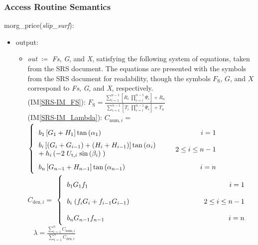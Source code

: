 \documentclass[12pt, titlepage]{article}
\newcommand{\iref}[1]{IM\ref{#1}}
\begin{document}
\subsubsection{Access Routine Semantics}
morg\_price(\textit{slip\_surf}):
\begin{itemize}
	\item output:
	\begin{itemize}
		\item[] \textit{out} $\coloneqq$ \textit{Fs}, \textit{G}, and 
		\textit{X}, satisfying the following system of 
		equations, taken from the SRS document. The equations are presented 
		with the symbols from the SRS document for readability, though the 
		symbols $F_\text{S}$, $G$, and $X$ correspond to \textit{Fs}, 
		\textit{G}, and \textit{X}, respectively.\\
		
		(\iref{SRS-IM_FS}): \( {F_\text{S}}= 
		\frac{\displaystyle\sum_{i=1}^{n-1} \left[ 
		{R_{i}}
			\;{\displaystyle\prod_{c=i}^{n-1} \Psi_{c}
			}\right] + {R_{n}} }{\displaystyle\sum_{i=1}^{n-1} \left[ {T_{i}}
			\;{\displaystyle\prod_{c=i}^{n-1} \Psi_{c}
			}\right] + {T_{n}} } \)\\
		
		(\iref{SRS-IM_Lambda}): \( {C_{\text{num},i}}= \) 
		\(  \left\{
		\renewcommand{\arraystretch}{2}
		\begin{tabular}{ p{6.5cm} r} 
		$ {{b}_{\text{1}}}\left[{{G}_{\text{1}} + {H}_{\text{1}}}
		\right]{\tan\left(\alpha_{\text{1}}\right) } $ &  $
		i={\text{1}} $ \\
		\noindent\parbox[c]{\hsize} {$ {{b}_{i}} \left[
			\left({{G}_{i} + {G}_{i-1}}\right) +
			\left({{H}_{i} + {H}_{i-1}}\right)
			\right]{\tan\left(\alpha_{i}\right)} \\ +
			{{h}_{i}}\left( 
			-{2}\;{U_{\text{t},i}}\;{\sin\left(\beta_{i}\right)}
			\;\right) $}
		&  $ 2\leq i \leq{n-1} $ \\ $
		{{b}_{n}}\left[{{G}_{n-1} +
			{H}_{n-1}}\right]{\tan\left(\alpha_{n-1}\right)
		} $ &  $ i=n $ \\
		\end{tabular} 
		\renewcommand{\arraystretch}{1}
		\right. \)
		~\newline~\newline
		\( {C_{\text{den},i}}= \)
		\(  \left\{
		\renewcommand{\arraystretch}{2}
		\begin{tabular}{ p{6.5cm} r} 
		$ {{b}_{\text{1}}}{{G}_{\text{1}}}{f_{\text{1}}} $ &  $
		i=\text{1} $ \\ $ {{b}_{i}}\;{\left({
				{f_{i}}{{G}_{i}} +
				{f_{i-1}}{{G}_{i-1}} }\right)} $ &  $
		2\leq i \leq{n-1} $ \\ $
		{{b}_{n}}{{G}_{n-1}}{f_{n-1}} $ &  $
		i=n $ \\
		\end{tabular} 
		\renewcommand{\arraystretch}{1}
		\right. \) 
		~\newline
		\( \lambda= \frac{ \displaystyle\sum_{i=1}^{n} {C_{\text{num},i}}}
		{\displaystyle\sum_{i=1}^{n} {C_{\text{den},i}}} \) \\
		

\end{itemize}
\end{itemize}
\end{document}
